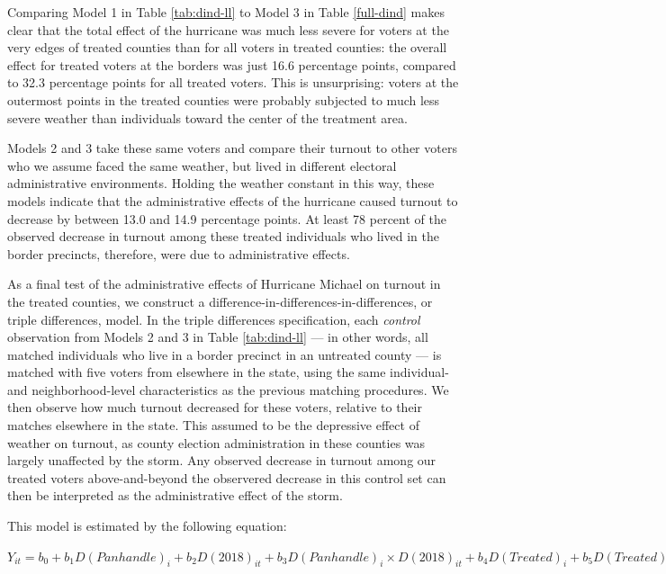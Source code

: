 \documentclass[
  12pt,
]{article}
\begin{document}
Comparing Model 1 in Table \ref{tab:dind-ll} to Model 3 in Table \ref{full-dind} makes clear that the total effect of the hurricane was much less severe for voters at the very edges of treated counties than for all voters in treated counties: the overall effect for treated voters at the borders was just 16.6 percentage points, compared to 32.3 percentage points for all treated voters. This is unsurprising: voters at the outermost points in the treated counties were probably subjected to much less severe weather than individuals toward the center of the treatment area.

Models 2 and 3 take these same voters and compare their turnout to other voters who we assume faced the same weather, but lived in different electoral administrative environments. Holding the weather constant in this way, these models indicate that the administrative effects of the hurricane caused turnout to decrease by between 13.0 and 14.9 percentage points. At least 78 percent of the observed decrease in turnout among these treated individuals who lived in the border precincts, therefore, were due to administrative effects.

As a final test of the administrative effects of Hurricane Michael on turnout in the treated counties, we construct a difference-in-differences-in-differences, or triple differences, model. In the triple differences specification, each \emph{control} observation from Models 2 and 3 in Table \ref{tab:dind-ll} --- in other words, all matched individuals who live in a border precinct in an untreated county --- is matched with five voters from elsewhere in the state, using the same individual- and neighborhood-level characteristics as the previous matching procedures. We then observe how much turnout decreased for these voters, relative to their matches elsewhere in the state. This assumed to be the depressive effect of weather on turnout, as county election administration in these counties was largely unaffected by the storm. Any observed decrease in turnout among our treated voters above-and-beyond the observered decrease in this control set can then be interpreted as the administrative effect of the storm.

This model is estimated by the following equation:

\(Y_{it}=b_0+b_1D(Panhandle)_{i}+b_2D(2018)_{it}+b_3D(Panhandle)_{i}\times D(2018)_{it} + b_4D(Treated)_{i} + b_5D(Treated)_{i}\times D(2018)_{it}\)
\end{document}
